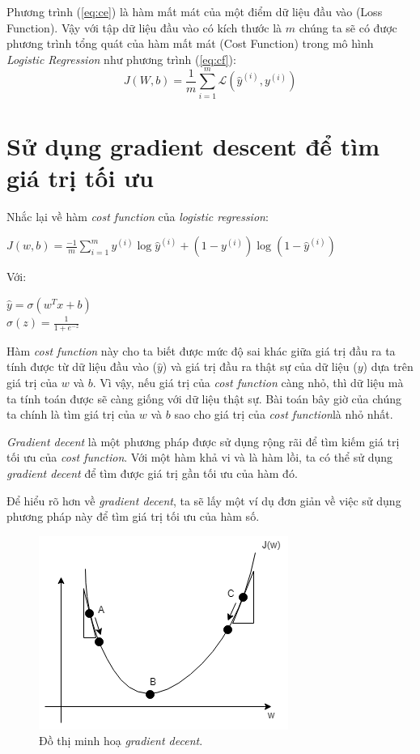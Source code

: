 Phương trình (\ref{eq:ce}) là hàm mất mát của một điểm dữ liệu đầu vào (Loss Function). Vậy với tập dữ liệu đầu vào có kích thước là $m$ chúng ta sẽ có được phương trình tổng quát của hàm mất mát (Cost Function) trong mô hình \textit{Logistic Regression} như phương trình (\ref{eq:cf}):
\begin{equation}
    J(W, b) = \frac{1}{m}\sum_{i = 1}^m\mathcal{L}(\hat{y}^{(i)}, y^{(i)})
    \label{eq:cf}
\end{equation}

\section{Sử dụng gradient descent để tìm giá trị tối ưu}
Nhắc lại về hàm \textit{cost function} của \textit{logistic regression}:
\begin{center}
$J(w, b) = \frac{-1}{m}\sum_{i=1}^{m}y^{(i)}\log \hat{y}^{(i)}+(1-y^{(i)})\log (1-\hat{y}^{(i)})$
\end{center}
Với:
\begin{center}
$\hat{y}=\sigma (w^{T}x + b)$\\
$\sigma (z) = \frac{1}{1+e^{-z}}$\\
\end{center}

Hàm \textit{cost function} này cho ta biết được mức độ sai khác giữa giá trị đầu ra ta tính được từ dữ liệu đầu vào ($\hat{y}$) và giá trị đầu ra thật sự của dữ liệu ($y$) dựa trên giá trị của $w$ và $b$. Vì vậy, nếu giá trị của \textit{cost function} càng nhỏ, thì dữ liệu mà ta tính toán được sẽ càng giống với dữ liệu thật sự. Bài toán bây giờ của chúng ta chính là tìm giá trị của $w$ và $b$ sao cho giá trị của \textit{cost function}là nhỏ nhất.

\textit{Gradient decent} là một phương pháp được sử dụng rộng rãi để tìm kiếm giá trị tối ưu của \textit{cost function}. Với một hàm khả vi và là hàm lồi, ta có thể sử dụng \textit{gradient decent} để tìm được giá trị gần tối ưu của hàm đó.

Để hiểu rõ hơn về \textit{gradient decent}, ta sẽ lấy một ví dụ đơn giản về việc sử dụng phương pháp này để tìm giá trị tối ưu của hàm số.
\clearpage
\begin{figure}[!h]
\centerline{\includegraphics{books/artificial-neural-network/chapter02/figure/grad_1.png}}
\caption{Đồ thị minh hoạ \textit{gradient decent}.}
\label{fig:grad_1}
\end{figure}

